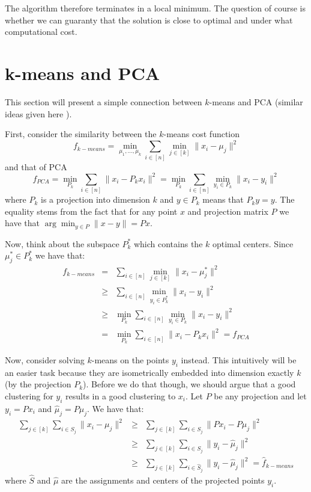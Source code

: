 \documentclass{article}
\begin{document}
The algorithm therefore terminates in a local minimum.
The question of course is whether we can guaranty that the solution is close to optimal and under what computational cost.

\section{k-means and PCA}
This section will present a simple connection between $k$-means and PCA (similar ideas given here \cite{DingH04a}).

First, consider the similarity between the $k$-means cost function
\[
f_{k-means} = \min_{\mu_1,\ldots,\mu_k} \sum_{i \in [n]} \min_{j \in [k]} \|x_i - \mu_j \|^2
\]
and that of PCA
\[
f_{PCA} = \min_{P_k} \sum_{i \in [n]} \|x_i - P_{k} x_i \|^2 = \min_{P_k} \sum_{i \in [n]} \min_{y_i \in P_k} \|x_i - y_i \|^2
\]
where $P_k$ is a projection into dimension $k$ and $y \in P_k$ means that $P_k y = y$.
The equality stems from the fact that for any point $x$ and projection matrix $P$ we have that $\arg\min_{y \in P} \|x - y\| = Px$.

Now, think about the subspace $P^{*}_{k}$ which contains the $k$ optimal centers. 
Since $\mu^{*}_{j} \in P^{*}_{k}$ we have that:
\begin{eqnarray}
f_{k-means} &=& \sum_{i \in [n]} \min_{j \in [k]} \|x_i - \mu^{*}_j \|^2 \\
&\ge& \sum_{i \in [n]} \min_{y_i \in P^{*}_{k}} \|x_i - y_i \|^2 \\
&\ge& \min_{P_{k}}\sum_{i \in [n]} \min_{y_i \in P_{k}} \|x_i - y_i \|^2 \\
&=&  \min_{P_{k}}\sum_{i \in [n]} \|x_i - P_k x_i \|^2 = f_{PCA}
\end{eqnarray}

Now, consider solving $k$-means on the points $y_i$ instead. This intuitively will be an easier task
because they are isometrically embedded into dimension exactly $k$ (by the projection $P_k$). 
Before we do that though, we should argue that a good clustering for $y_i$ results in a good clustering to $x_i$.
Let $P$ be any projection and let $y_i = Px_i$ and $\hat{\mu}_{j} = P{\mu}_{j}$. We have that:
\begin{eqnarray}
\sum_{j \in [k]} \sum_{i \in S_j}  \|x_i - \mu_j \|^2 &\ge& \sum_{j \in [k]} \sum_{i \in S_j}  \|Px_i - P\mu_j \|^2 \\
&\ge& \sum_{j \in [k]} \sum_{i \in S_j}  \|y_i - \hat{\mu}_{j}\|^2 \\
&\ge& \sum_{j \in [k]} \sum_{i \in \hat{S}_j}  \|y_i - \hat{\mu}_{j}\|^2 = \hat{f}_{k-means}
\end{eqnarray}
where $\hat{S}$ and $\hat{\mu}$ are the assignments and centers of the projected points $y_i$.
\end{document}
